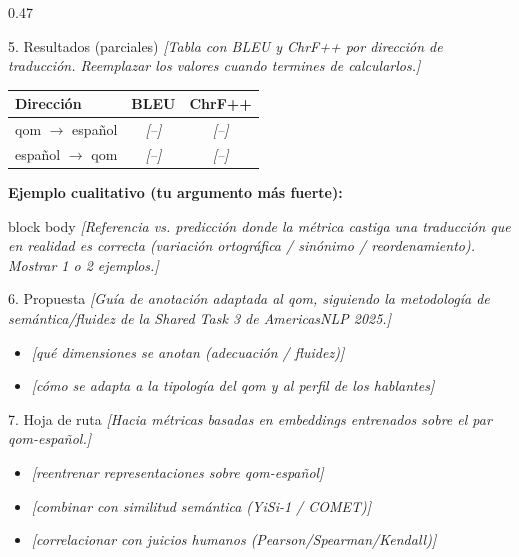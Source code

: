 \documentclass[final]{beamer}
\newcommand{\ph}[1]{{\color{ph}\itshape [#1]}}
\begin{document}
\begin{frame}[t]
\begin{columns}[t]
\begin{column}{0.47\paperwidth}
  \begin{block}{5. Resultados (parciales)}
    \ph{Tabla con BLEU y ChrF++ por dirección de traducción. Reemplazar los
        valores cuando termines de calcularlos.}
    \vspace{0.5cm}
    \begin{center}
    \renewcommand{\arraystretch}{1.5}
    \begin{tabularx}{0.85\linewidth}{Xcc}
      \toprule
      \textbf{Dirección} & \textbf{BLEU} & \textbf{ChrF++} \\
      \midrule
      qom $\rightarrow$ español & \ph{--} & \ph{--} \\
      español $\rightarrow$ qom & \ph{--} & \ph{--} \\
      \bottomrule
    \end{tabularx}
    \end{center}
    \vspace{0.6cm}
    \textbf{Ejemplo cualitativo (tu argumento más fuerte):}
    \vspace{0.3cm}
    \begin{beamercolorbox}[sep=0.5cm,rounded=true]{block body}
      \ph{Referencia vs. predicción donde la métrica castiga una traducción
          que en realidad es correcta (variación ortográfica / sinónimo /
          reordenamiento). Mostrar 1 o 2 ejemplos.}
    \end{beamercolorbox}
  \end{block}

  \begin{block}{6. Propuesta}
    \ph{Guía de anotación adaptada al qom, siguiendo la metodología de
        semántica/fluidez de la Shared Task 3 de AmericasNLP 2025.}
    \begin{itemize}
      \item \ph{qué dimensiones se anotan (adecuación / fluidez)}
      \item \ph{cómo se adapta a la tipología del qom y al perfil de los hablantes}
    \end{itemize}
  \end{block}

  \begin{block}{7. Hoja de ruta}
    \ph{Hacia métricas basadas en embeddings entrenados sobre el par
        qom-español.}
    \begin{itemize}
      \item \ph{reentrenar representaciones sobre qom-español}
      \item \ph{combinar con similitud semántica (YiSi-1 / COMET)}
      \item \ph{correlacionar con juicios humanos (Pearson/Spearman/Kendall)}
    \end{itemize}
  \end{block}


\end{column}
\end{columns}
\end{frame}
\end{document}
